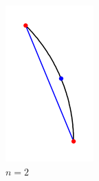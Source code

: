\documentclass{gshs_thesis}
\theoremstyle{theorem}
\theoremstyle{lemma}
\theoremstyle{definition}
\begin{document}
\begin{figure}[h]
\begin{center}
\begin{subfigure}{.2\textwidth}
			\includegraphics[width=\textwidth]{image/BCstep2}
			\caption{$n=2$}
		\end{subfigure}
		\begin{subfigure}{.2\textwidth}

\end{subfigure}
\end{center}
\end{figure}
\end{document}
